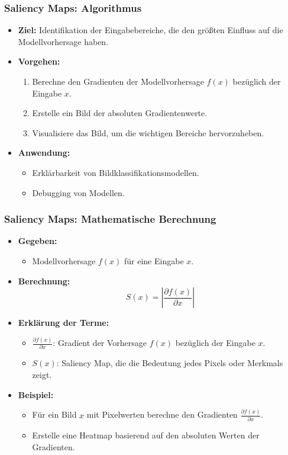 \documentclass[aspectratio=1610, xcolor=dvipsnames, 9pt]{beamer}
\begin{document}
\begin{frame}
  \frametitle{Saliency Maps: Algorithmus}
  \begin{itemize}
    \item \textbf{Ziel:} Identifikation der Eingabebereiche, die den größten Einfluss auf die Modellvorhersage haben.
    \item \textbf{Vorgehen:}
    \begin{enumerate}
      \item Berechne den Gradienten der Modellvorhersage $f(x)$ bezüglich der Eingabe $x$.
      \item Erstelle ein Bild der absoluten Gradientenwerte.
      \item Visualisiere das Bild, um die wichtigen Bereiche hervorzuheben.
    \end{enumerate}
    \item \textbf{Anwendung:} 
    \begin{itemize}
      \item Erklärbarkeit von Bildklassifikationsmodellen.
      \item Debugging von Modellen.
    \end{itemize}
  \end{itemize}
\end{frame}

\begin{frame}
  \frametitle{Saliency Maps: Mathematische Berechnung}
  \begin{itemize}
    \item \textbf{Gegeben:}
    \begin{itemize}
      \item Modellvorhersage $f(x)$ für eine Eingabe $x$.
    \end{itemize}
    \item \textbf{Berechnung:}
    \[
    S(x) = \left| \frac{\partial f(x)}{\partial x} \right|
    \]
    \item \textbf{Erklärung der Terme:}
    \begin{itemize}
      \item $\frac{\partial f(x)}{\partial x}$: Gradient der Vorhersage $f(x)$ bezüglich der Eingabe $x$.
      \item $S(x)$: Saliency Map, die die Bedeutung jedes Pixels oder Merkmals zeigt.
    \end{itemize}
    \item \textbf{Beispiel:}
    \begin{itemize}
      \item Für ein Bild $x$ mit Pixelwerten berechne den Gradienten $\frac{\partial f(x)}{\partial x}$.
      \item Erstelle eine Heatmap basierend auf den absoluten Werten der Gradienten.
    \end{itemize}
  \end{itemize}
\end{frame}
\end{document}
